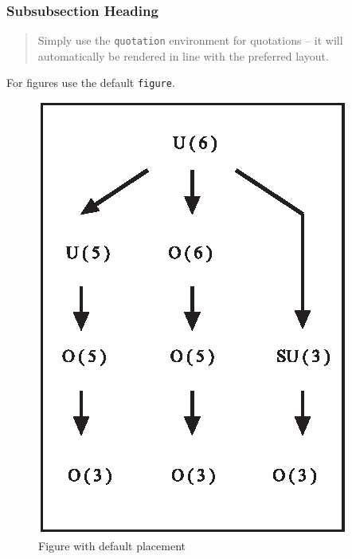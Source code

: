 \begin{bibunit}
\subsubsection{Subsubsection Heading}\label{01:subsection:2:2}

\begin{quotation}
	Simply use the \verb|quotation| environment for quotations -- it will automatically be rendered in line with the preferred layout.
\end{quotation}

For figures use the default \verb|figure|.
%
\begin{figure}[b]
	\includegraphics[scale=.65]{assets/figure}
	\caption{Figure with default placement}
	\label{01:fig:1}
\end{figure}


\end{bibunit}
